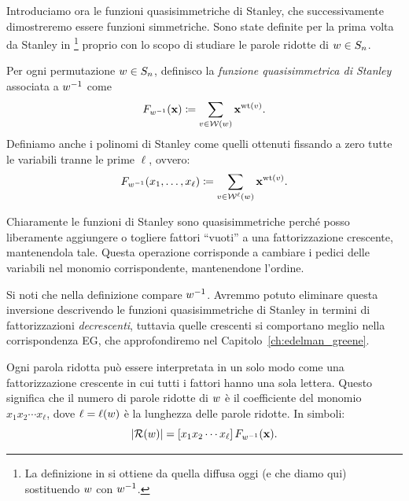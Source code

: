 Introduciamo ora le funzioni quasisimmetriche di Stanley, che successivamente dimostreremo
essere funzioni simmetriche.
Sono state definite
per la prima volta da Stanley in \cite{stanley-84}\footnote{
    La definizione in \cite{stanley-84} si ottiene da quella diffusa
    oggi (e che diamo qui) sostituendo $w$ con $w^{-1}$.
}
proprio con lo scopo di studiare le parole ridotte di $w \in S_n$.


\begin{definition}
    \label{def:stanley_f_qsimm}
    Per ogni permutazione $w \in S_n$, definisco la \emph{funzione quasisimmetrica
    di Stanley} associata a $w^{-1}$ come 
    \[ 
        F_{w^{-1}}(\mathbf{x})
        \coloneq \sum_{ v \in \operatorname{\mathcal{W}}(w) } \mathbf{x}^{\operatorname{wt}(v)}.
    \]
    Definiamo anche i polinomi di Stanley come quelli ottenuti fissando a zero
    tutte le variabili tranne le prime $\ell$, ovvero:
    \[
        F_{w^{-1}}(x_1, \dots, x_\ell)
        \coloneq \sum_{ v \in \operatorname{\mathcal{W}}^\ell(w) } \mathbf{x}^{\operatorname{wt}(v)}.
    \]
\end{definition}

Chiaramente le funzioni di Stanley sono quasisimmetriche perch\'e posso
liberamente aggiungere o togliere fattori ``vuoti'' a una fattorizzazione 
crescente, mantenendola tale.
Questa operazione corrisponde a cambiare i pedici delle variabili 
nel monomio corrispondente, mantenendone l'ordine.

Si noti che nella definizione compare $w^{-1}$. 
Avremmo potuto eliminare questa inversione descrivendo le funzioni quasisimmetriche
di Stanley in termini di fattorizzazioni \emph{decrescenti},
tuttavia quelle crescenti si comportano meglio nella corrispondenza EG, che
approfondiremo nel Capitolo~\ref{ch:edelman_greene}.

\begin{remark}
    Ogni parola ridotta pu\`o essere interpretata in un solo modo come una
    fattorizzazione crescente in cui tutti i fattori hanno una sola lettera.
    Questo significa che il numero di parole ridotte di $w$ \`e il coefficiente
    del monomio $x_1 x_2 \cdots x_\ell$, dove $\ell = \operatorname{\ell}(w)$ \`e la 
    lunghezza delle parole ridotte.
    In simboli:
    \[ 
        \lvert \operatorname{\mathcal{R}}(w) \rvert = [ x_1 x_2 \cdots x_\ell ] \, F_{w^{-1}} (\mathbf{x}).
    \]
\end{remark}



